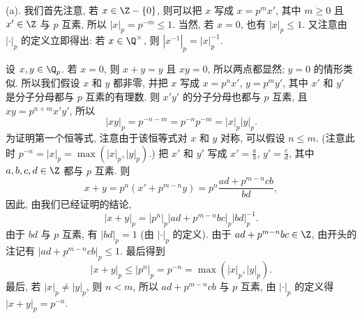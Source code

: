 \begin{solution}
(a). 我们首先注意, 若 $x \in \Z - \{0\}$, 则可以把 $x$ 写成 $x = p^mx'$, 其中 $m \geq 0$ 且 $x' \in \Z$ 与 $p$ 互素, 所以 $|x|_p = p^{-m} \leq 1$. 当然, 若 $x = 0$, 也有 $|x|_p \leq 1$.
又注意由 $|\cdot|_p$ 的定义立即得出: 若 $x \in \Q^{\times}$, 则 $|x^{-1}|_p = |x|_p^{-1}$.

设 $x, y \in \Q_p$. 若 $x = 0$, 则 $x + y = y$ 且 $xy = 0$, 所以两点都显然; $y = 0$ 的情形类似. 所以我们假设 $x$ 和 $y$ 都非零, 并把 $x$ 写成 $x = p^nx'$, $y = p^my'$, 其中 $x'$ 和 $y'$ 是分子分母都与 $p$ 互素的有理数. 则 $x'y'$ 的分子分母也都与 $p$ 互素, 且 $xy = p^{n+m}x'y'$, 所以
\[
|xy|_p = p^{-n-m} = p^{-n}p^{-m} = |x|_p|y|_p.
\]
为证明第一个恒等式, 注意由于该恒等式对 $x$ 和 $y$ 对称, 可以假设 $n \leq m$. (注意此时 $p^{-n} = |x|_p = \max(|x|_p, |y|_p)$.) 把 $x'$ 和 $y'$ 写成 $x' = \frac{a}{b}$, $y' = \frac{c}{d}$, 其中 $a, b, c, d \in \Z$ 都与 $p$ 互素. 则
\[
x + y = p^n(x' + p^{m-n}y) = p^n\frac{ad + p^{m-n}cb}{bd},
\]
因此, 由我们已经证明的结论,
\[
|x + y|_p = |p^n|_p|ad + p^{m-n}bc|_p|bd|_p^{-1}.
\]
由于 $bd$ 与 $p$ 互素, 有 $|bd|_p = 1$ (由 $|\cdot|_p$ 的定义). 由于 $ad + p^{m-n}bc \in \Z$, 由开头的注记有 $|ad + p^{m-n}cb|_p \leq 1$. 最后得到
\[
|x + y|_p \leq |p^n|_p = p^{-n} = \max(|x|_p, |y|_p).
\]
最后, 若 $|x|_p \neq |y|_p$, 则 $n < m$, 所以 $ad + p^{m-n}cb$ 与 $p$ 互素, 由 $|\cdot|_p$ 的定义得 $|x + y|_p = p^{-n}$.


\end{solution}
